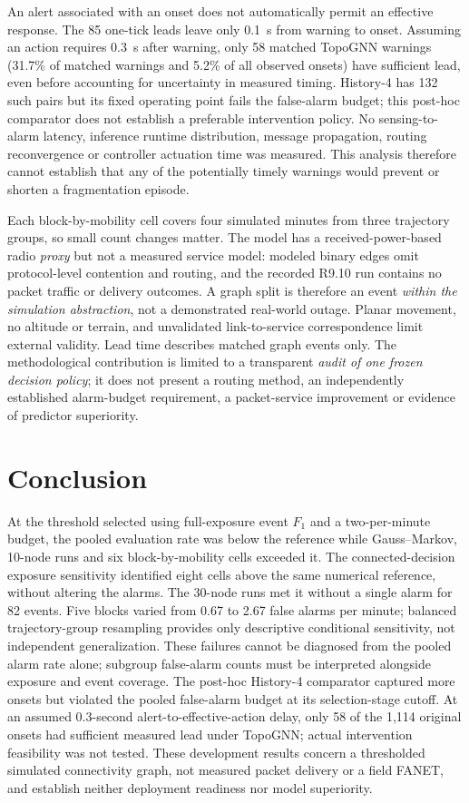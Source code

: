 \documentclass[10pt,a4paper]{article}
\begin{document}
An alert associated with an onset does not automatically permit an effective response. The 85 one-tick leads leave only 0.1~s from warning to onset. Assuming an action requires 0.3~s after warning, only 58 matched TopoGNN warnings (31.7\% of matched warnings and 5.2\% of all observed onsets) have sufficient lead, even before accounting for uncertainty in measured timing. History-4 has 132 such pairs but its fixed operating point fails the false-alarm budget; this post-hoc comparator does not establish a preferable intervention policy. No sensing-to-alarm latency, inference runtime distribution, message propagation, routing reconvergence or controller actuation time was measured. This analysis therefore cannot establish that any of the potentially timely warnings would prevent or shorten a fragmentation episode.\par

Each block-by-mobility cell covers four simulated minutes from three trajectory groups, so small count changes matter. The model has a received-power-based radio \emph{proxy} but not a measured service model: modeled binary edges omit protocol-level contention and routing, and the recorded R9.10 run contains no packet traffic or delivery outcomes. A graph split is therefore an event \emph{within the simulation abstraction}, not a demonstrated real-world outage. Planar movement, no altitude or terrain, and unvalidated link-to-service correspondence limit external validity. Lead time describes matched graph events only. The methodological contribution is limited to a transparent \emph{audit of one frozen decision policy}; it does not present a routing method, an independently established alarm-budget requirement, a packet-service improvement or evidence of predictor superiority.

\section{Conclusion}

At the threshold selected using full-exposure event $F_1$ and a two-per-minute budget, the pooled evaluation rate was below the reference while Gauss--Markov, 10-node runs and six block-by-mobility cells exceeded it. The connected-decision exposure sensitivity identified eight cells above the same numerical reference, without altering the alarms. The 30-node runs met it without a single alarm for 82 events. Five blocks varied from 0.67 to 2.67 false alarms per minute; balanced trajectory-group resampling provides only descriptive conditional sensitivity, not independent generalization. These failures cannot be diagnosed from the pooled alarm rate alone; subgroup false-alarm counts must be interpreted alongside exposure and event coverage. The post-hoc History-4 comparator captured more onsets but violated the pooled false-alarm budget at its selection-stage cutoff. At an assumed 0.3-second alert-to-effective-action delay, only 58 of the 1,114 original onsets had sufficient measured lead under TopoGNN; actual intervention feasibility was not tested. These development results concern a thresholded simulated connectivity graph, not measured packet delivery or a field FANET, and establish neither deployment readiness nor model superiority.
\end{document}
